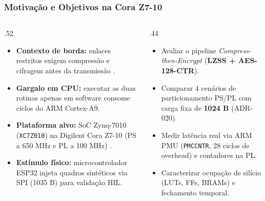 \documentclass[../main.tex]{subfiles}
\begin{document}
\begin{frame}
  \frametitle{Motiva\c{c}\~ao e Objetivos na Cora Z7-10}
  \begin{columns}[T]
    \begin{column}{.52\textwidth}
      \begin{itemize}
        \item \textbf{Contexto de borda:} enlaces restritos exigem compress\~ao e cifragem antes da transmiss\~ao \autocite{NISTSP80038A}.
        \item \textbf{Gargalo em CPU:} executar as duas rotinas apenas em software consome ciclos do ARM Cortex-A9.
        \item \textbf{Plataforma alvo:} SoC Zynq-7010 (\texttt{XC7Z010}) na Digilent Cora Z7-10 (PS a 650 MHz e PL a 100 MHz) \autocite{DigilentCoraZ7,XilinxUG585}.
        \item \textbf{Est\'imulo f\'isico:} microcontrolador ESP32 injeta quadros sint\'eticos via SPI (1035 B) para valida\c{c}\~ao HIL.
      \end{itemize}
    \end{column}
    \begin{column}{.44\textwidth}
      \begin{pontoschave}
        \begin{itemize}
          \item Avaliar o pipeline \textit{Compress-then-Encrypt} (\textbf{LZSS + AES-128-CTR}).
          \item Comparar 4 cen\'arios de particionamento PS/PL com carga fixa de \textbf{1024 B} (ADR-020).
          \item Medir lat\^encia real via ARM PMU (\texttt{PMCCNTR}, 28 ciclos de overhead) e contadores na PL.
          \item Caracterizar ocupa\c{c}\~ao de sil\'icio (LUTs, FFs, BRAMs) e fechamento temporal.
        \end{itemize}
      \end{pontoschave}
    \end{column}
  \end{columns}
\end{frame}
\end{document}
